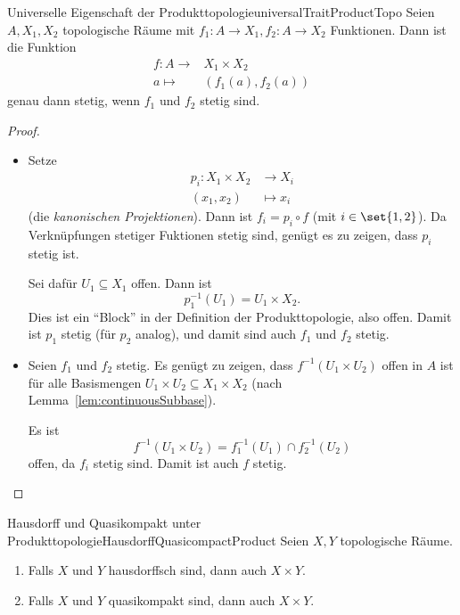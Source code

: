\documentclass[language=ngerman]{TemplateLecture} %
\begin{document}
\begin{thm}{Universelle Eigenschaft der Produkttopologie}{universalTraitProductTopo}
    Seien $A, X_1, X_2$ topologische Räume mit $f_1: A \to X_1, f_2: A \to X_2$ Funktionen. Dann ist die Funktion 
    \begin{align*}
        f: A \to& X_1 \times X_2 \\
        a \mapsto& (f_1(a), f_2(a))
    \end{align*}
    genau dann stetig, wenn $f_1$ und $f_2$ stetig sind.
\end{thm}
\begin{proof}
    \begin{itemize}
        \item[\enquote{$\Rightarrow$}:] Setze
        \begin{align*}
            p_i: X_1 \times X_2 &\to X_i \\
            (x_1, x_2) &\mapsto x_i
        \end{align*}
        (die \emph{kanonischen Projektionen}). Dann ist $f_i = p_i \circ f$ (mit $i \in \set{1,2}$). Da Verknüpfungen stetiger Fuktionen stetig sind, genügt es zu zeigen, dass $p_i$ stetig ist.

        Sei dafür $U_1 \subseteq X_1$ offen. Dann ist 
        \begin{equation*}
            p_1^{-1}(U_1) = U_1 \times X_2.
        \end{equation*}
        Dies ist ein \enquote{Block} in der Definition der Produkttopologie, also offen. Damit ist $p_1$ stetig (für $p_2$ analog), und damit sind auch $f_1$ und $f_2$ stetig.
        \item[\enquote{$\Leftarrow$}:] Seien $f_1$ und $f_2$ stetig. Es genügt zu zeigen, dass $f^{-1}(U_1 \times U_2)$ offen in $A$ ist für alle Basismengen $U_1 \times U_2 \subseteq X_1 \times X_2$ (nach Lemma~\ref{lem:continuousSubbase}).
        
        Es ist 
        \begin{equation*}
            f^{-1}(U_1 \times U_2) = f_1^{-1}(U_1) \cap f_2^{-1}(U_2)
        \end{equation*}
        offen, da $f_i$ stetig sind. Damit ist auch $f$ stetig.
    \end{itemize}
\end{proof}

\begin{thm}{Hausdorff und Quasikompakt unter Produkttopologie}{HausdorffQuasicompactProduct}
    Seien $X, Y$ topologische Räume.
    \begin{enumerate}[$(i)$]
        \item Falls $X$ und $Y$ hausdorffsch sind, dann auch $X \times Y$.
        \item Falls $X$ und $Y$ quasikompakt sind, dann auch $X \times Y$.
    \end{enumerate}
\end{thm}
\end{document}
